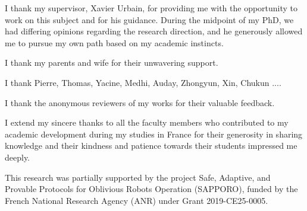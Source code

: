 

I thank my supervisor, Xavier Urbain, for providing me with the opportunity to work on this subject and for
 his guidance. During the midpoint of my PhD, we had differing opinions  regarding the research direction, and he generously allowed me to pursue my own path based on my academic instincts.

I thank my parents and wife for their unwavering support. 

I thank Pierre, Thomas, Yacine, Medhi, Auday, Zhongyun, Xin, Chukun ....

I thank the anonymous reviewers of my works for their valuable feedback. 

I extend my sincere thanks to all the faculty members who contributed to my academic development during my studies in France for their generosity in sharing knowledge and their kindness and patience towards their students impressed me deeply.

This research was partially supported by the project Safe, Adaptive, and Provable Protocols for Oblivious Robots Operation (SAPPORO), funded by the French National Research Agency (ANR) under Grant 2019-CE25-0005.

